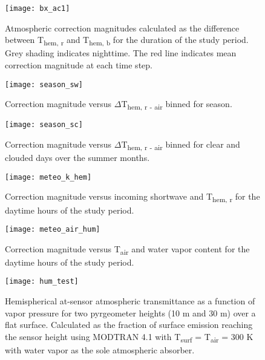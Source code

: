 \begin{bibunit}
\begin{figure}[H]
	\centering
	\texttt{[image: bx\_ac1]}
	\caption{Atmospheric correction magnitudes calculated as the difference between T\textsubscript{hem, r} and T\textsubscript{hem, b} for the duration of the study period. Grey shading indicates nighttime. The red line indicates mean correction magnitude at each time step.}
	\label{bx_ac}
\end{figure}

\begin{figure}[H]
	\centering
	\texttt{[image: season\_sw]}
	\caption{Correction magnitude versus $\Delta$T\textsubscript{hem, r - air} binned for season.}
	\label{season_sw}
\end{figure}

\begin{figure}[H]
	\centering
	\texttt{[image: season\_sc]}
	\caption{Correction magnitude versus $\Delta$T\textsubscript{hem, r - air} binned for clear and clouded days over the summer months.}
	\label{season_sc}
\end{figure}

\begin{figure}[H]
	\centering
	\texttt{[image: meteo\_k\_hem]}
	\caption{Correction magnitude versus incoming shortwave and T\textsubscript{hem, r} for the daytime hours of the study period.}
	\label{meteo_k_hem}
\end{figure}

\begin{figure}[H]
	\centering
	\texttt{[image: meteo\_air\_hum]}
	\caption{Correction magnitude versus T\textsubscript{air} and water vapor content for the daytime hours of the study period.}
	\label{meteo_air_hum}
\end{figure}

\begin{figure}[H]
	\centering
	\texttt{[image: hum\_test]}
	\caption{Hemispherical at-sensor atmospheric transmittance as a function of vapor pressure for two pyrgeometer heights (10 \si{\meter} and 30 \si{\meter}) over a flat surface. Calculated as the fraction of surface emission reaching the sensor height using MODTRAN 4.1 with T\textsubscript{surf} = T\textsubscript{air} = 300 \si{\kelvin} with water vapor as the sole atmospheric absorber.}
	\label{humtest}
\end{figure}


\end{bibunit}
